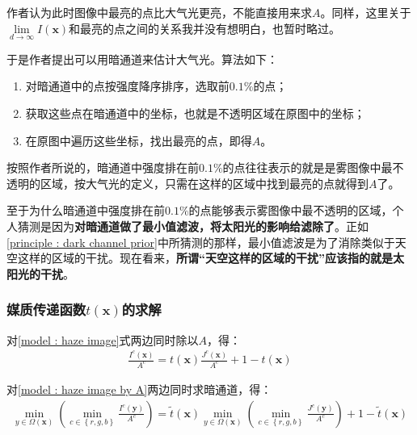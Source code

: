 \documentclass[UTF8]{ctexart}
\begin{document}
                \indent 作者认为此时图像中最亮的点比大气光更亮，不能直接用来求$A$。同样，这里关于$\mathop{lim}\limits_{d \to \infty}I\left( \mathbf{x} \right)$和最亮的点之间的关系我并没有想明白，也暂时略过。
                
                \indent 于是作者提出可以用暗通道来估计大气光。算法如下：
                
                    \begin{enumerate}[leftmargin=50pt]
                        \item 对暗通道中的点按强度降序排序，选取前$0.1\%$的点；
                        \item 获取这些点在暗通道中的坐标，也就是不透明区域在原图中的坐标；
                        \item 在原图中遍历这些坐标，找出最亮的点，即得$A$。
        			\end{enumerate}  
                
                \indent 按照作者所说的，暗通道中强度排在前$0.1\%$的点往往表示的就是是雾图像中最不透明的区域，按大气光的定义，只需在这样的区域中找到最亮的点就得到$A$了。
                
                \indent 至于为什么暗通道中强度排在前$0.1\%$的点能够表示雾图像中最不透明的区域，个人猜测是因为\textbf{对暗通道做了最小值滤波，将太阳光的影响给滤除了}。正如\ref{principle : dark channel prior}中所猜测的那样，最小值滤波是为了消除类似于天空这样的区域的干扰。现在看来，\textbf{所谓“天空这样的区域的干扰”应该指的就是太阳光的干扰}。
                
            \subsubsection*{媒质传递函数$t\left( \mathbf{x} \right)$的求解}
                \indent 对\ref{model : haze image}式两边同时除以$A$，得：
                    \begin{align}
                        \frac{ I^{c}\left( \mathbf{x} \right) }{ A^c } = t\left( \mathbf{x} \right)\frac{J^{c}\left( \mathbf{x} \right)}{A^c} + 1 - t\left( \mathbf{x} \right) \label{model : haze image by A}
                    \end{align}
                    
                \indent 对\ref{model : haze image by A}两边同时求暗通道，得：
                    \begin{align}
                        \mathop{min}\limits_{ y \in \Omega \left( \mathbf{x} \right)} \left( \mathop{min}\limits_{c \in \left\{ r, g, b \right\}  }  \frac{ I^c \left( \mathbf{y} \right) }{A^c} \right) = \widetilde{t}\left( \mathbf{x} \right) \mathop{min}\limits_{ y \in \Omega \left( \mathbf{x} \right)} \left( \mathop{min}\limits_{c \in \left\{ r, g, b \right\}  }  \frac{ J^c \left( \mathbf{y} \right)}{ A^c } \right) + 1 - \widetilde{t}\left( \mathbf{x} \right) \label{model : dark channel of haze image}
                    \end{align}
                    
\end{document}
